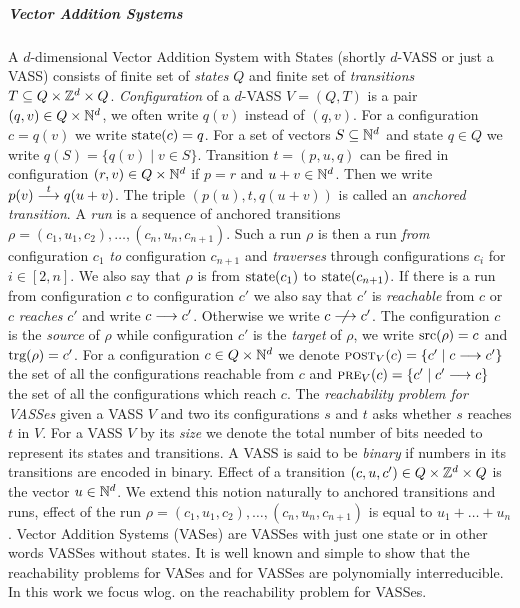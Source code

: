 \subparagraph*{Vector Addition Systems}
A $d$-dimensional Vector Addition System with States (shortly $d$-VASS or just a VASS) consists of finite set of \emph{states} $Q$
and finite set of \emph{transitions} $T \subseteq Q \times \mathbb{Z}^d \times Q$. 
\emph{Configuration} of a $d$-VASS $V = (Q, T)$ is a pair $(q, v) \in Q \times \mathbb{N}^d$, we often write $q(v)$ instead of $(q, v)$.
For a configuration $c = q(v)$ we write $\textup{state}(c) = q$.
For a set of vectors $S \subseteq \mathbb{N}^d$ and state $q \in Q$ we write $q(S) = \{q(v) \mid v \in S\}$.
Transition $t = (p, u, q)$ can be fired in configuration $(r, v) \in Q \times \mathbb{N}^d$ if $p = r$ and $u+v \in \mathbb{N}^d$.
Then we write $p(v) \stackrel{t}{\longrightarrow} q(u+v)$. The triple $(p(u), t, q(u+v))$ is called an \emph{anchored transition}.
A \emph{run} is a sequence of anchored transitions $\rho = (c_1, u_1, c_2), \ldots, (c_n, u_n, c_{n+1})$.
Such a run $\rho$ is then a run \emph{from} configuration $c_1$ \emph{to} configuration $c_{n+1}$
and \emph{traverses} through configurations $c_i$ for $i \in [2,n]$.
We also say that $\rho$ is from $\textup{state}(c_1)$ to $\textup{state}(c_{n+1})$.
If there is a run from configuration $c$ to configuration $c'$ we also say that $c'$ is \emph{reachable} from $c$
or $c$ \emph{reaches} $c'$ and write $c \longrightarrow c'$. Otherwise we write $c \nreaches c'$.
The configuration $c$ is the \emph{source} of $\rho$ while configuration $c'$ is the \emph{target} of $\rho$,
we write $\textup{src}(\rho) = c$ and $\textup{trg}(\rho) = c'$.
For a configuration $c \in Q \times \mathbb{N}^d$ we denote $\textsc{post}_V(c) = \{c' \mid c \longrightarrow c'\}$
the set of all the configurations reachable from $c$ and $\textsc{pre}_V(c) = \{c' \mid c' \longrightarrow c \}$
the set of all the configurations which reach $c$.
The \emph{reachability problem for VASSes} given a VASS $V$ and two its configurations $s$ and $t$
asks whether $s$ reaches $t$ in $V$.
For a VASS $V$ by its \emph{size} we denote the total number of bits needed to represent its states and transitions.
A VASS is said to be \emph{binary} if numbers in its transitions are encoded in binary.
Effect of a transition $(c, u, c') \in Q \times \mathbb{Z}^d \times Q$ is the vector $u \in \mathbb{N}^d$.
We extend this notion naturally to anchored transitions and runs, effect of the run $\rho = (c_1, u_1, c_2), \ldots, (c_n, u_n, c_{n+1})$
is equal to $u_1 + \ldots + u_n$.
Vector Addition Systems (VASes) are VASSes with just one state or in other words VASSes without states.
It is well known and simple to show that the reachability problems for VASes and for VASSes are polynomially interreducible.
In this work we focus wlog. on the reachability problem for VASSes.

